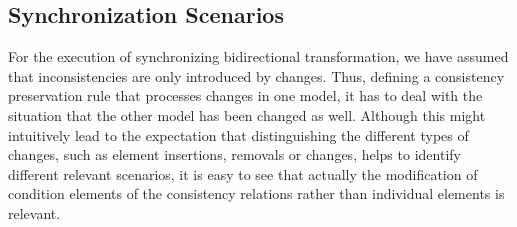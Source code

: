 



\subsection{Synchronization Scenarios}

For the execution of synchronizing bidirectional transformation, we have assumed that inconsistencies are only introduced by changes.
Thus, defining a consistency preservation rule that processes changes in one model, it has to deal with the situation that the other model has been changed as well.
Although this might intuitively lead to the expectation that distinguishing the different types of changes, such as element insertions, removals or changes, helps to identify different relevant scenarios, it is easy to see that actually the modification of condition elements of the consistency relations rather than individual elements is relevant.

